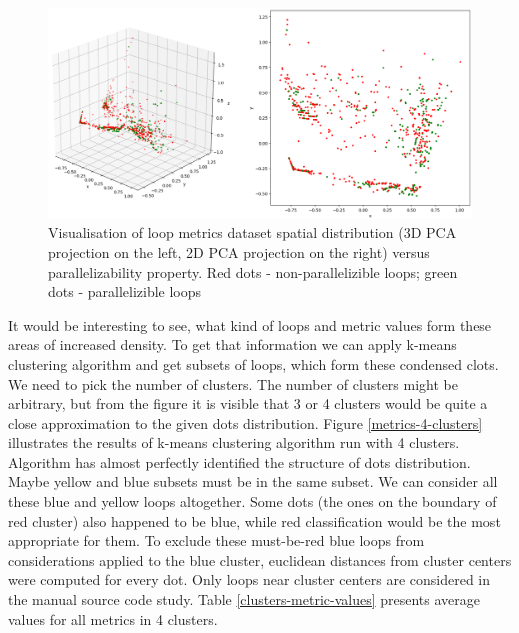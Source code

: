 \begin{figure}[htb]
\centering
\includegraphics[width=\linewidth]{figs/metrics-pca-parallelizability.png}
\caption{Visualisation of loop metrics dataset spatial distribution (3D PCA projection on the left, 2D PCA projection on the right) versus parallelizability property. Red dots - non-parallelizible loops; green dots - parallelizible loops}
\label{metrics-pca-parallelizability}
\end{figure} \newline
\null \qquad It would be interesting to see, what kind of loops and metric values form these areas of increased density. To get that information we can apply k-means clustering algorithm and get subsets of loops, which form these condensed clots. We need to pick the number of clusters. The number of clusters might be arbitrary, but from the figure it is visible that 3 or 4 clusters would be quite a close approximation to the given dots distribution. Figure \ref{metrics-4-clusters} illustrates the results of k-means clustering algorithm run with 4 clusters. Algorithm has almost perfectly identified the structure of dots distribution. Maybe yellow and blue subsets must be in the same subset. We can consider all these blue and yellow loops altogether. Some dots (the ones on the boundary of red cluster) also happened to be blue, while red classification would be the most appropriate for them. To exclude these must-be-red blue loops from considerations applied to the blue cluster, euclidean distances from cluster centers were computed for every dot. Only loops near cluster centers are considered in the manual source code study. Table \ref{clusters-metric-values} presents average values for all metrics in 4 clusters. \newline
\null\qquad 

